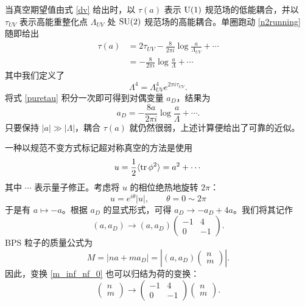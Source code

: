 当真空期望值由式 \eqref{dv} 给出时，以 $\tau(a)$ 表示 ${\mathrm{U}}(1)$ 规范场的低能耦合，并以 $\tau_{UV}$ 表示高能重整化点 $\Lambda_{UV}$ 处 $\mathop{\mathrm{SU}}(2)$ 规范场的高能耦合。单圈跑动 \eqref{n2running} 随即给出
\begin{align}
\tau(a)&=2\tau_{UV}-\frac{8}{2\pi i}\log \frac{a}{\Lambda_{UV}}+\cdots \\
&=-\frac{8}{2\pi i}\log \frac{a}{\Lambda} + \cdots\label{puretau}
\end{align}
其中我们定义了
\begin{equation}
\Lambda^4 = \Lambda_{UV}^4 e^{2\pi i \tau_{UV}}.\label{lambdaSU2pure}
\end{equation}
将式 \eqref{puretau} 积分一次即可得到对偶变量 $a_D$，结果为
\begin{equation}
a_D=-\frac{8a}{2\pi i}\log\frac{a}{\Lambda} + \cdots.
\end{equation}
只要保持 $|a|\gg |\Lambda|$，耦合 $\tau(a)$ 就仍然很弱，上述计算便给出了可靠的近似。

一种以规范不变方式标记超对称真空的方法是使用
\begin{equation}
u=\frac12\langle\mathop{\mathrm{tr}}\nolimits\phi^2\rangle=a^2+\cdots
\end{equation}
其中 $\cdots$ 表示量子修正。考虑将 $u$ 的相位绝热地旋转 $2\pi$：
\begin{equation}
u=e^{i\theta}|u|, \qquad \theta=0 \sim 2\pi
\end{equation}
于是有 $a\mapsto -a$。根据 $a_D$ 的显式形式，可得 $a_D\to -a_D+4a$。我们将其记作
\begin{equation}
(a,a_D)\to (a,a_D) \begin{pmatrix}
-1 & 4 \\
0 & -1
\end{pmatrix}.\label{amat}
\end{equation}
BPS 粒子的质量公式为
\begin{equation}
M=|na+ma_D|=\left|
(a,a_D)
\begin{pmatrix}
n \\ m
\end{pmatrix}
\right|.
\end{equation}
因此，变换 \eqref{m_inf_nf_0} 也可以归结为荷的变换：
\begin{equation}
\begin{pmatrix}
n \\ m
\end{pmatrix}
\to
\begin{pmatrix}
-1 & 4 \\
0 & -1
\end{pmatrix}
\begin{pmatrix}
n \\ m
\end{pmatrix}.\label{chargemat}
\end{equation}

